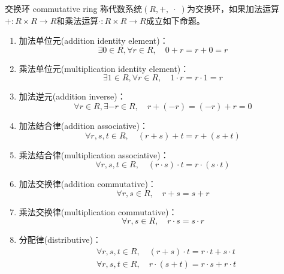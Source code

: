 \begin{definition}{交换环 commutative ring}
	称代数系统$(R,+,\;\cdot\;)$为交换环，如果加法运算$+:R\times R\to R$和乘法运算$\cdot :R\times R\to R$成立如下命题。
	\begin{enumerate}
		\item 加法单位元(addition identity element)：
		$$
		\exists 0\in R,\forall r\in R,\quad 0+r=r+0=r
		$$
		\item 乘法单位元(multiplication identity element)：
		$$
		\exists 1\in R,\forall r\in R,\quad 1\cdot r=r\cdot 1=r
		$$
		\item 加法逆元(addition inverse)：
		$$
		\forall r\in R,\exists-r\in R,\quad r+(-r)=(-r)+r=0
		$$
		\item 加法结合律(addition associative)：
		$$
		\forall r,s,t\in R,\quad (r+s)+t=r+(s+t)
		$$
		\item 乘法结合律(multiplication associative)：
		$$
		\forall r,s,t\in R,\quad (r\cdot s)\cdot t=r\cdot (s\cdot t)
		$$
		\item 加法交换律(addition commutative)：
		$$
		\forall r,s\in R,\quad r+s=s+r
		$$
		\item 乘法交换律(multiplication commutative)：
		$$
		\forall r,s\in R,\quad r\cdot s=s\cdot r
		$$
		\item 分配律(distributive)：
		\begin{align*}
			&\forall r,s,t\in R,\quad (r+s)\cdot t=r\cdot t+s\cdot t\\
			&\forall r,s,t\in R,\quad r\cdot(s+t)=r\cdot s+r\cdot t
		\end{align*}
	\end{enumerate}
\end{definition}


